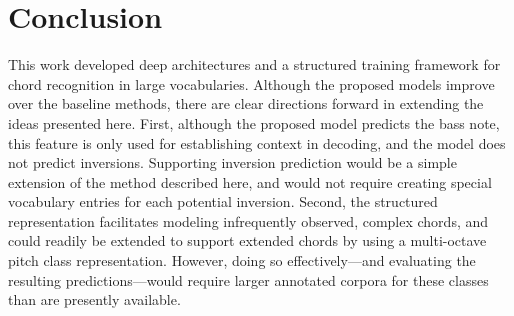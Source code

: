 \documentclass{article}
\begin{document}
\section{Conclusion}
This work developed deep architectures and a structured training framework for chord recognition in large vocabularies.
Although the proposed models improve over the baseline methods, there are clear directions forward in extending the ideas presented here.
First, although the proposed model predicts the bass note, this feature is only used for establishing context in decoding, and the model does not predict inversions.
Supporting inversion prediction would be a simple extension of the method described here, and would not require creating special vocabulary entries for each potential inversion.
Second, the structured representation facilitates modeling infrequently observed, complex chords, and could readily be extended to support extended chords by using a multi-octave pitch class representation.
However, doing so effectively---and evaluating the resulting predictions---would require larger annotated corpora for these classes than are presently available.

%       




\end{document}
